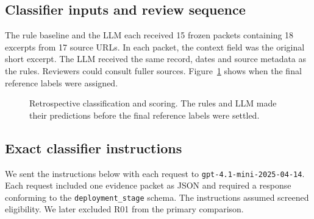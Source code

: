 \subsection*{Classifier inputs and review sequence}
The rule baseline and the LLM each received 15 frozen packets containing
18 excerpts from 17 source URLs. In each packet, the context field was the
original short excerpt. The LLM received the same record, dates and source
metadata as the rules. Reviewers could consult fuller sources. Figure~\ref{fig:morocco-pilot-flow}
shows when the final reference labels were assigned.

\begin{figure}[htbp]
\centering
{}
\caption{Retrospective classification and scoring. The rules and LLM made
their predictions before the final reference labels were settled.}
\label{fig:morocco-pilot-flow}
\end{figure}

\subsection*{Exact classifier instructions}
We sent the instructions below with each request to
\texttt{gpt-4.1-mini-2025-04-14}. Each request included one evidence
packet as JSON and required a response conforming to the
\texttt{deployment\_stage} schema. The instructions assumed screened
eligibility. We later excluded R01 from the primary comparison.


